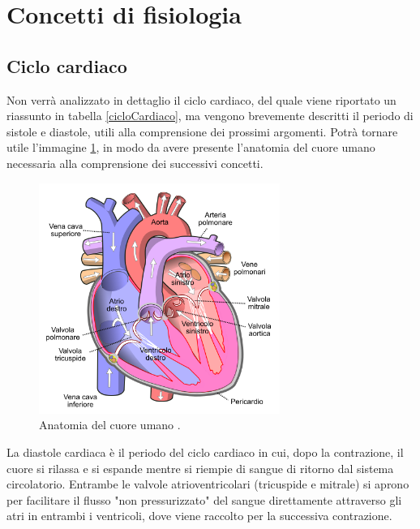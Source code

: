 \newpage




\section{Concetti di fisiologia}

\subsection{Ciclo cardiaco}
Non verrà analizzato in dettaglio il ciclo cardiaco, del quale viene riportato un riassunto in tabella \ref{cicloCardiaco}, ma vengono brevemente descritti il periodo di sistole e diastole, utili alla comprensione dei prossimi argomenti. Potrà tornare utile l'immagine \ref{wiki: cuore}, in modo da avere presente l'anatomia del cuore umano necessaria alla comprensione dei successivi concetti.

\begin{figure}[h]
    \centering
    \includegraphics[width=0.7\textwidth]{images/Windkessel/Cuore.png}
    \caption{Anatomia del cuore umano \cite{wiki:cicloCardiaco}.}
    \label{wiki: cuore}
\end{figure}

La diastole cardiaca è il periodo del ciclo cardiaco in cui, dopo la contrazione, il cuore si rilassa e si espande mentre si riempie di sangue di ritorno dal sistema circolatorio. Entrambe le valvole atrioventricolari (tricuspide e mitrale) si aprono per facilitare il flusso "non pressurizzato" del sangue direttamente attraverso gli atri in entrambi i ventricoli, dove viene raccolto per la successiva contrazione. \\

